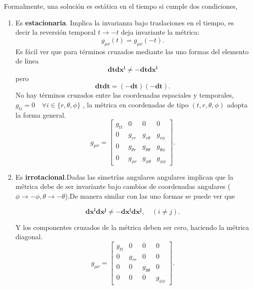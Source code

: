 Formalmente, una solución es estática en el tiempo si cumple dos condiciones,
\begin{enumerate}
    \item  Es \textbf{estacionaria}. Implica la invarianza bajo traslaciones en el tiempo, es decir la reversión temporal \( t \to -t \) deja invariante la métrica:
          \[ g_{\mu\nu}(t) = g_{\mu\nu}(-t). \]
Es fácil ver que para términos cruzados mediante las uno formas del elemento de linea
\begin{equation}
\mathbf{dt}\mathbf{dx^i} \neq \mathbf{-dt}\mathbf{dx^i}     
\end{equation}
pero
\begin{equation}
\mathbf{dt}\mathbf{dt} = (\mathbf{-dt})(\mathbf{-dt}) .    
\end{equation}
No hay términos cruzados entre las coordenadas espaciales y temporales, $ g_{ti} = 0 \quad \forall i \in \{r, \theta, \phi\}$ , la métrica en coordenadas de tipo \((t, r, \theta, \phi)\) adopta la forma general. 
\begin{equation}
    g_{\mu \nu} =
    \begin{bmatrix}
        g_{tt} & 0            & 0                & 0              \\
        0      & g_{rr}       & g_{r\theta}      & g_{r\phi}      \\
        0      & g_{\theta r} & g_{\theta\theta} & g_{\theta\phi} \\
        0      & g_{\phi r}   & g_{\phi\theta}   & g_{\phi\phi}
    \end{bmatrix}.
\end{equation}
    \item Es \textbf{irrotacional}.Dadas las simetrías angulares angulares implican que la métrica debe de ser invariante bajo cambios de coordenadas angulares ($\phi \rightarrow  - \phi, \theta \rightarrow  - \theta$).De manera similar con las uno formas se puede ver que

\begin{equation}
\mathbf{dx^i}\mathbf{dx^j} \neq -\mathbf{dx^i}\mathbf{dx^j}, \quad (i \neq j ) . 
\end{equation}

Y los componentes cruzados de la métrica deben ser cero, haciendo la métrica diagonal. 
\begin{equation}
    g_{\mu \nu} =
    \begin{bmatrix}
        g_{tt} & 0            & 0                & 0              \\
        0      & g_{rr}       &   0    &  0  \\
        0      & 0 & g_{\theta\theta} &0 \\
        0      &  0  & 0 & g_{\phi\phi}
    \end{bmatrix}.
\end{equation}
\end{enumerate}



